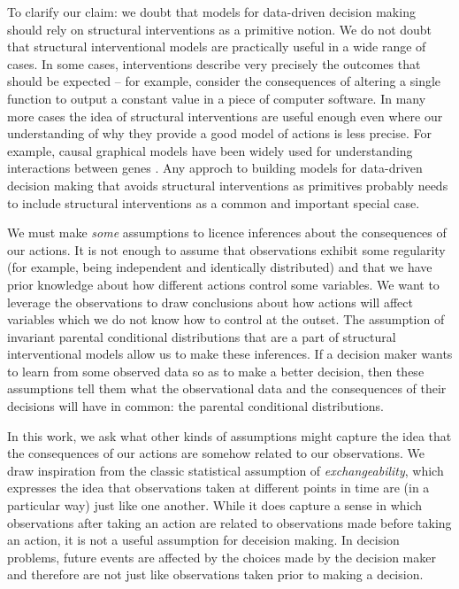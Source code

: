 \documentclass{article}
\begin{document}
To clarify our claim: we doubt that models for data-driven decision making should rely on structural interventions as a primitive notion. We do not doubt that structural interventional models are practically useful in a wide range of cases. In some cases, interventions describe very precisely the outcomes that should be expected -- for example, consider the consequences of altering a single function to output a constant value in a piece of computer software. In many more cases the idea of structural interventions are useful enough even where our understanding of why they provide a good model of actions is less precise. For example, causal graphical models have been widely used for understanding interactions between genes \citep{badshaLearningCausalBiological2019}. Any approch to building models for data-driven decision making that avoids structural interventions as primitives probably needs to include structural interventions as a common and important special case.

We must make \emph{some} assumptions to licence inferences about the consequences of our actions. It is not enough to assume that observations exhibit some regularity (for example, being independent and identically distributed) and that we have prior knowledge about how different actions control some variables. We want to leverage the observations to draw conclusions about how actions will affect variables which we do not know how to control at the outset. The assumption of invariant parental conditional distributions that are a part of structural interventional models allow us to make these inferences. If a decision maker wants to learn from some observed data so as to make a better decision, then these assumptions tell them what the observational data and the consequences of their decisions will have in common: the parental conditional distributions.

In this work, we ask what other kinds of assumptions might capture the idea that the consequences of our actions are somehow related to our observations. We draw inspiration from the classic statistical assumption of \emph{exchangeability}, which expresses the idea that observations taken at different points in time are (in a particular way) just like one another. While it does capture a sense in which observations after taking an action are related to observations made before taking an action, it is not a useful assumption for deceision making. In decision problems, future events are affected by the choices made by the decision maker and therefore are not just like observations taken prior to making a decision.
\end{document}
